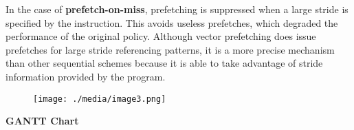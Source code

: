 \documentclass[12pt]{article}
\begin{document}
{\fontsize{15pt}{18.0pt}\selectfont In the case of \textbf{prefetch-on-miss}, prefetching is suppressed when a large stride is specified by the instruction. This avoids useless prefetches, which degraded the performance of the original policy. Although vector prefetching does issue prefetches for large stride referencing patterns, it is a more precise mechanism than other sequential schemes because it is able to take advantage of stride information provided by the program.\par}\par




\begin{figure}[H]
	\begin{Center}
		\texttt{[image: ./media/image3.png]}
	\end{Center}
\end{figure}



\par


\vspace{\baselineskip}

\vspace{\baselineskip}

\vspace{\baselineskip}

\vspace{\baselineskip}

\vspace{\baselineskip}

\vspace{\baselineskip}

\vspace{\baselineskip}

\vspace{\baselineskip}

\vspace{\baselineskip}

\vspace{\baselineskip}

\vspace{\baselineskip}
{\fontsize{20pt}{24.0pt}\selectfont \textbf{\textcolor[HTML]{222222}{GANTT Chart}}\par}\par
\end{document}
